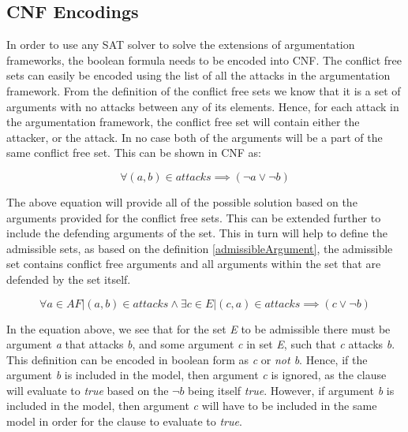 \subsection{CNF Encodings}
In order to use any SAT solver to solve the extensions of argumentation frameworks, the boolean formula needs to be encoded into CNF. The conflict free sets can easily be encoded using the list of all the attacks in the argumentation framework. From the definition of the conflict free sets we know that it is a set of arguments with no attacks between any of its elements. Hence, for each attack in the argumentation framework, the conflict free set will contain either the attacker, or the attack. In no case both of the arguments will be a part of the same conflict free set. This can be shown in CNF as:

\begin{equation}
	  \forall (a,b) \in attacks \implies (\neg a \lor \neg b)
\end{equation}

The above equation will provide all of the possible solution based on the arguments provided for the conflict free sets. This can be extended further to include the defending arguments of the set. This in turn will help to define the admissible sets, as based on the definition \ref{admissibleArgument}, the admissible set contains conflict free arguments and all arguments within the set that are defended by the set itself.

\begin{equation}
\forall a \in AF | (a,b) \in attacks \land \exists c \in E | (c,a) \in attacks \implies (c \lor \neg b)
\end{equation}

In the equation above, we see that for the set \textit{E} to be admissible there must be argument \textit{a} that attacks \textit{b}, and some argument \textit{c} in set \textit{E}, such that \textit{c} attacks \textit{b}. This definition can be encoded in boolean form as \textit{c} or \textit{not b}. Hence, if the argument \textit{b} is included in the model, then argument \textit{c} is ignored, as the clause will evaluate to \textit{true} based on the $\neg b$ being itself \textit{true}. However, if argument \textit{b} is included in the model, then argument \textit{c} will have to be included in the same model in order for the clause to evaluate to \textit{true}.